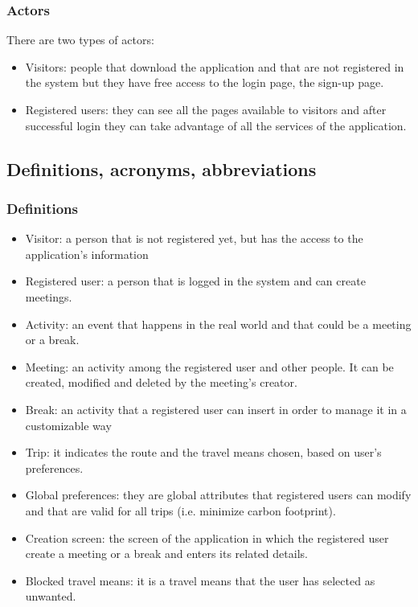 \documentclass[12pt,titlepage]{article}
\begin{document}
\subsubsection{Actors}\label{RASD}
There are two types of actors:
\begin{itemize}
\item Visitors: people that download the application and that are not registered in the system but they have free access to the login page, the sign-up page.
\item Registered users: they can see all the pages available to visitors and after successful login they can take advantage of all the services of the application.

\end{itemize}


\subsection{Definitions, acronyms, abbreviations}\label{RASD}
\subsubsection{Definitions}\label{RASD}
\begin{itemize}
\item Visitor: a person that is not registered yet, but has the access to the application's information 
\item	Registered user: a person that is logged in the system and can create meetings.
\item	Activity: an event that happens in the real world and that could be a meeting or a break.
\item	Meeting: an activity among the registered user and other people. It can be created, modified and deleted by the meeting's creator. 
\item	Break: an activity that a registered user can insert in order to manage it in a customizable way
\item Trip: it indicates the route and the travel means chosen, based on user's preferences.
\item Global preferences: they are global attributes that registered users can modify and that are valid for all trips (i.e. minimize carbon footprint).
\item	Creation screen: the screen of the application in which the registered user create a meeting or a break and enters its related details.
\item Blocked travel means: it is a travel means that the user has selected as unwanted.
\end{itemize}
\end{document}
